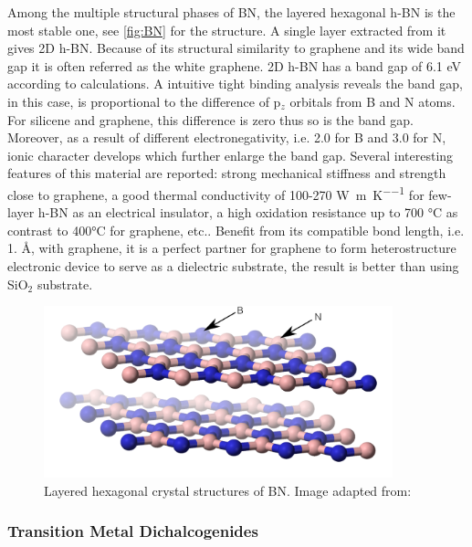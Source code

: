 Among the multiple structural phases of BN, the layered hexagonal h-BN is the most stable one, see \autoref{fig:BN} for the structure. A single layer extracted from it gives 2D h-BN. Because of its structural similarity to graphene and its wide band gap it is often referred as the white graphene\cite{alem2009atomically}. 2D h-BN has a band gap of 6.1 eV according to calculations. A intuitive tight binding analysis reveals the band gap, in this case, is proportional to the difference of p$_z$ orbitals from B and N atoms. For silicene and graphene, this difference is zero thus so is the band gap. Moreover, as a result of different electronegativity, i.e. 2.0 for B and 3.0 for N, ionic character develops which further enlarge the band gap\cite{zhuang2012}. Several interesting features of this material are reported: strong mechanical stiffness and strength close to graphene\cite{Bosak2006}, a good thermal conductivity of 100-270 \si{\watt\per\meter\per\kelvin} for few-layer h-BN\cite{Jo2013} as an electrical insulator, a high oxidation resistance up to 700 \si{\celsius} as contrast to 400\si{\celsius} for graphene\cite{li2016atomically}, etc.. Benefit from its compatible bond length, i.e. 1. \AA, with graphene, it is a perfect partner for graphene to form heterostructure electronic device to serve as a dielectric substrate\cite{Lee2013}, the result is better than using SiO$_2$ substrate\cite{dean2010boron}. 


\begin{figure}[htbp!] 
\centering  
\includegraphics[width=0.9\textwidth]{BN.png}
\caption{Layered hexagonal crystal structures of BN. Image adapted from:\cite{Benjah2007}}  
\label{fig:BN}
\end{figure} 


\subsubsection{Transition Metal Dichalcogenides}

